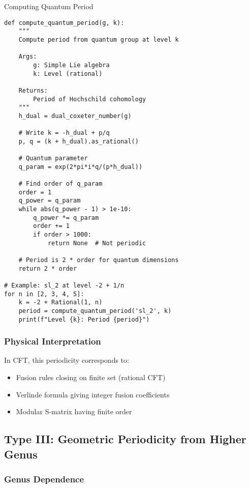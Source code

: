 \begin{algorithm}
\caption{Computing Quantum Period}
\begin{verbatim}
def compute_quantum_period(g, k):
    """
    Compute period from quantum group at level k
    
    Args:
        g: Simple Lie algebra
        k: Level (rational)
    
    Returns:
        Period of Hochschild cohomology
    """
    h_dual = dual_coxeter_number(g)
    
    # Write k = -h_dual + p/q
    p, q = (k + h_dual).as_rational()
    
    # Quantum parameter
    q_param = exp(2*pi*i*q/(p*h_dual))
    
    # Find order of q_param
    order = 1
    q_power = q_param
    while abs(q_power - 1) > 1e-10:
        q_power *= q_param
        order += 1
        if order > 1000:
            return None  # Not periodic
    
    # Period is 2 * order for quantum dimensions
    return 2 * order

# Example: sl_2 at level -2 + 1/n
for n in [2, 3, 4, 5]:
    k = -2 + Rational(1, n)
    period = compute_quantum_period('sl_2', k)
    print(f"Level {k}: Period {period}")
\end{verbatim}
\end{algorithm}

\subsubsection{Physical Interpretation}

In CFT, this periodicity corresponds to:
\begin{itemize}
\item Fusion rules closing on finite set (rational CFT)
\item Verlinde formula giving integer fusion coefficients
\item Modular S-matrix having finite order
\end{itemize}

\subsection{Type III: Geometric Periodicity from Higher Genus}

\subsubsection{Genus Dependence}

